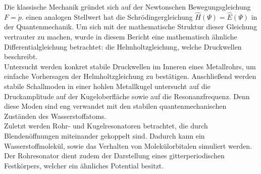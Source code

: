 \documentclass[../main.tex]{subfiles}
\begin{document}

Die klassische Mechanik gründet sich auf der Newtonschen Bewegungsgleichung $F = \dot p$. einen analogen Stellwert hat die Schrödingergleichung $\hat H(\Psi) = \hat E(\Psi)$ in der Quantenmechanik. Um sich mit der mathematische Struktur dieser Gleichung vertrauter zu machen, wurde in diesem Bericht eine mathematisch ähnliche Differentialgleichung betrachtet: die Helmholtzgleichung, welche Druckwellen beschreibt.\\

Untersucht werden konkret stabile Druckwellen im Inneren eines Metallrohrs, um einfache Vorhersagen der Helmholtzgleichung zu bestätigen. Anschließend werden stabile Schallmoden in einer hohlen Metallkugel untersucht auf die Druckamplitude auf der Kugeloberfläche sowie auf die Resonanzfrequenz. Denn diese Moden sind eng verwandet mit den stabilen quantenmechanischen Zuständen des Wasserstoffatoms.\\

Zuletzt werden Rohr- und Kugelresonatoren betrachtet, die durch Blendenöffnungen miteinander gekoppelt sind. Dadurch kann ein Wasserstoffmolekül, sowie das Verhalten von Molekülorbitalen simuliert werden. Der Rohresonator dient zudem der Darstellung eines gitterperiodischen Festkörpers, welcher ein ähnliches Potential besitzt.
\end{document}
